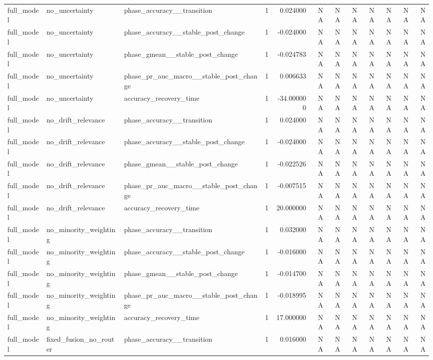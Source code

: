 \begin{tabular}{lllrrrrrrrrr}
full\_model & no\_uncertainty & phase\_accuracy\_\_transition & 1 & 0.024000 & NA & NA & NA & NA & NA & NA & NA \\
full\_model & no\_uncertainty & phase\_accuracy\_\_stable\_post\_change & 1 & -0.024000 & NA & NA & NA & NA & NA & NA & NA \\
full\_model & no\_uncertainty & phase\_gmean\_\_stable\_post\_change & 1 & -0.024783 & NA & NA & NA & NA & NA & NA & NA \\
full\_model & no\_uncertainty & phase\_pr\_auc\_macro\_\_stable\_post\_change & 1 & 0.006633 & NA & NA & NA & NA & NA & NA & NA \\
full\_model & no\_uncertainty & accuracy\_recovery\_time & 1 & -34.000000 & NA & NA & NA & NA & NA & NA & NA \\
full\_model & no\_drift\_relevance & phase\_accuracy\_\_transition & 1 & 0.024000 & NA & NA & NA & NA & NA & NA & NA \\
full\_model & no\_drift\_relevance & phase\_accuracy\_\_stable\_post\_change & 1 & -0.024000 & NA & NA & NA & NA & NA & NA & NA \\
full\_model & no\_drift\_relevance & phase\_gmean\_\_stable\_post\_change & 1 & -0.022526 & NA & NA & NA & NA & NA & NA & NA \\
full\_model & no\_drift\_relevance & phase\_pr\_auc\_macro\_\_stable\_post\_change & 1 & -0.007515 & NA & NA & NA & NA & NA & NA & NA \\
full\_model & no\_drift\_relevance & accuracy\_recovery\_time & 1 & 20.000000 & NA & NA & NA & NA & NA & NA & NA \\
full\_model & no\_minority\_weighting & phase\_accuracy\_\_transition & 1 & 0.032000 & NA & NA & NA & NA & NA & NA & NA \\
full\_model & no\_minority\_weighting & phase\_accuracy\_\_stable\_post\_change & 1 & -0.016000 & NA & NA & NA & NA & NA & NA & NA \\
full\_model & no\_minority\_weighting & phase\_gmean\_\_stable\_post\_change & 1 & -0.014700 & NA & NA & NA & NA & NA & NA & NA \\
full\_model & no\_minority\_weighting & phase\_pr\_auc\_macro\_\_stable\_post\_change & 1 & -0.018995 & NA & NA & NA & NA & NA & NA & NA \\
full\_model & no\_minority\_weighting & accuracy\_recovery\_time & 1 & 17.000000 & NA & NA & NA & NA & NA & NA & NA \\
full\_model & fixed\_fusion\_no\_router & phase\_accuracy\_\_transition & 1 & 0.016000 & NA & NA & NA & NA & NA & NA & NA \\

\end{tabular}
